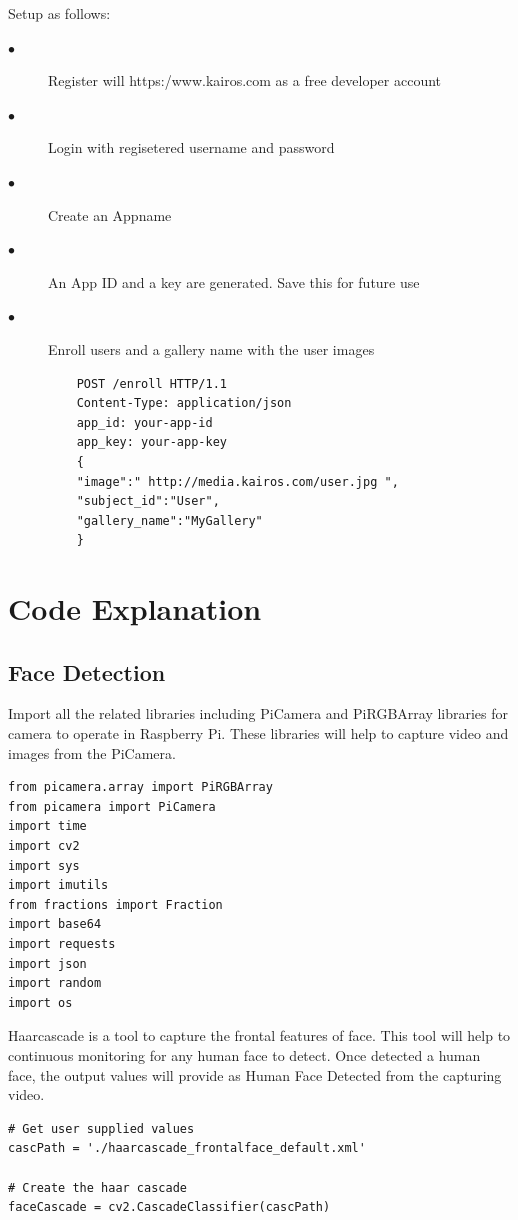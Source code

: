 \documentclass[sigconf]{acmart}
\begin{document}
Setup as follows:

\begin{description}
    \item[$\bullet$] Register will https:/www.kairos.com as a free developer account
    \item[$\bullet$] Login with regisetered username and password
    \item[$\bullet$] Create an Appname
    \item[$\bullet$] An App ID and a key are generated. Save this for future use
    \item[$\bullet$] Enroll users and a gallery name with the user images
    \begin{lstlisting}
    POST /enroll HTTP/1.1
    Content-Type: application/json
    app_id: your-app-id
    app_key: your-app-key
    {
    "image":" http://media.kairos.com/user.jpg ",
    "subject_id":"User",
    "gallery_name":"MyGallery"
    }
    \end{lstlisting}
\end{description}

\section{Code Explanation}
\subsection{Face Detection}
Import all the related libraries including PiCamera and PiRGBArray libraries for camera to operate in Raspberry Pi. These libraries will help to capture video and images from the PiCamera.

\begin{lstlisting}
from picamera.array import PiRGBArray
from picamera import PiCamera
import time
import cv2
import sys
import imutils
from fractions import Fraction
import base64
import requests
import json
import random
import os
\end{lstlisting}

Haarcascade is a tool to capture the frontal features of face. This tool will help to continuous monitoring for any human face to detect. Once detected a human face, the output values will provide as Human Face Detected from the capturing video.

\begin{lstlisting}
# Get user supplied values
cascPath = './haarcascade_frontalface_default.xml'

# Create the haar cascade
faceCascade = cv2.CascadeClassifier(cascPath)
\end{lstlisting}
\end{document}
